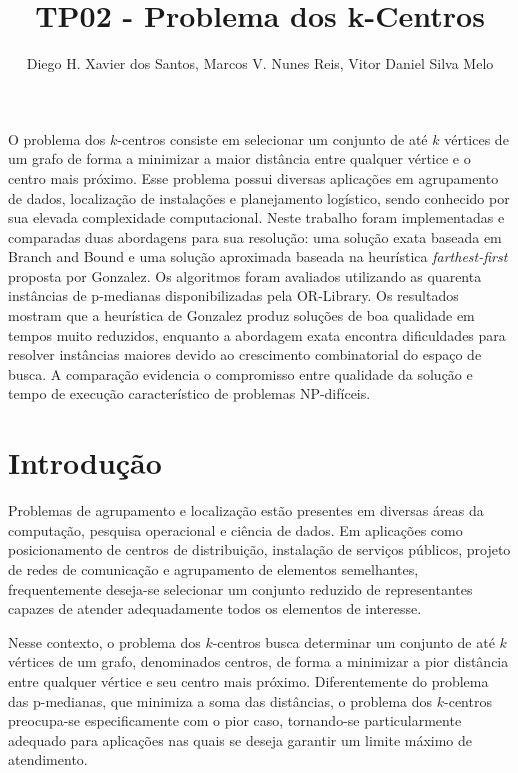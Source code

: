 \documentclass[12pt]{article}
\title{TP02 - Problema dos k-Centros}
\author{Diego H. Xavier dos Santos\inst{1}, Marcos V. Nunes Reis\inst{1}, Vitor Daniel Silva Melo\inst{1}}
\begin{document}
 

\maketitle
     
\begin{resumo}
O problema dos $k$-centros consiste em selecionar um conjunto de até $k$ vértices de um grafo de forma a minimizar a maior distância entre qualquer vértice e o centro mais próximo. Esse problema possui diversas aplicações em agrupamento de dados, localização de instalações e planejamento logístico, sendo conhecido por sua elevada complexidade computacional. Neste trabalho foram implementadas e comparadas duas abordagens para sua resolução: uma solução exata baseada em Branch and Bound e uma solução aproximada baseada na heurística \textit{farthest-first} proposta por Gonzalez. Os algoritmos foram avaliados utilizando as quarenta instâncias de p-medianas disponibilizadas pela OR-Library. Os resultados mostram que a heurística de Gonzalez produz soluções de boa qualidade em tempos muito reduzidos, enquanto a abordagem exata encontra dificuldades para resolver instâncias maiores devido ao crescimento combinatorial do espaço de busca\cite{cormen2009,dasgupta2006}. A comparação evidencia o compromisso entre qualidade da solução e tempo de execução característico de problemas NP-difíceis.
\end{resumo}

\section{Introdução}

Problemas de agrupamento e localização estão presentes em diversas áreas da computação, pesquisa operacional e ciência de dados. Em aplicações como posicionamento de centros de distribuição, instalação de serviços públicos, projeto de redes de comunicação e agrupamento de elementos semelhantes, frequentemente deseja-se selecionar um conjunto reduzido de representantes capazes de atender adequadamente todos os elementos de interesse.

Nesse contexto, o problema dos $k$-centros busca determinar um conjunto de até $k$ vértices de um grafo, denominados centros, de forma a minimizar a pior distância entre qualquer vértice e seu centro mais próximo. Diferentemente do problema das p-medianas, que minimiza a soma das distâncias, o problema dos $k$-centros preocupa-se especificamente com o pior caso, tornando-se particularmente adequado para aplicações nas quais se deseja garantir um limite máximo de atendimento.
\end{document}
